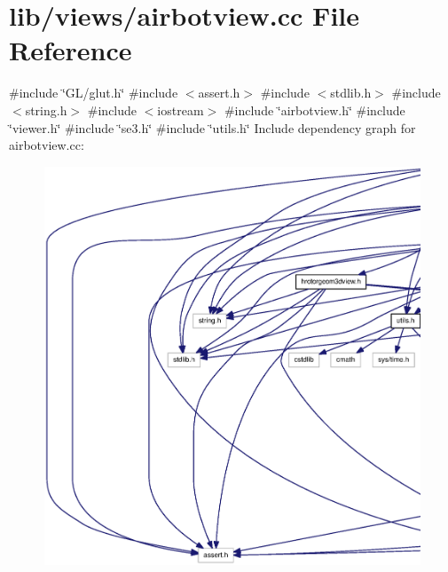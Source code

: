\section{lib/views/airbotview.cc \-File \-Reference}
\label{airbotview_8cc}
{\ttfamily \#include \char`\"{}\-G\-L/glut.\-h\char`\"{}}\*
{\ttfamily \#include $<$assert.\-h$>$}\*
{\ttfamily \#include $<$stdlib.\-h$>$}\*
{\ttfamily \#include $<$string.\-h$>$}\*
{\ttfamily \#include $<$iostream$>$}\*
{\ttfamily \#include \char`\"{}airbotview.\-h\char`\"{}}\*
{\ttfamily \#include \char`\"{}viewer.\-h\char`\"{}}\*
{\ttfamily \#include \char`\"{}se3.\-h\char`\"{}}\*
{\ttfamily \#include \char`\"{}utils.\-h\char`\"{}}\*
\-Include dependency graph for airbotview.\-cc\-:\nopagebreak
\begin{figure}[H]
\begin{center}
\leavevmode
\includegraphics[width=350pt]{airbotview_8cc__incl}
\end{center}
\end{figure}
